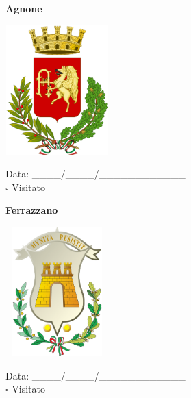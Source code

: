 \documentclass[a5paper,12pt]{article}
\begin{document}
\noindent
\begin{minipage}[t]{0.45\textwidth}
    \begin{center}
        \textbf{Agnone}
    \end{center}
    \vspace{-0.5cm} %
    \begin{center}
        \includegraphics[height= 5cm, width=4cm]{Molise/Agnone-Stemma.png}
    \end{center}
    \vspace{-0.4cm} %
    \begin{flushleft}
        Data: \_\_\_\_/\_\_\_\_/\_\_\_\_\_\_\_\_\_\_\_\_ \\
        $\square$ Visitato
    \end{flushleft}
\end{minipage}
\hfill
\begin{minipage}[t]{0.45\textwidth}
    \begin{center}
        \textbf{Ferrazzano}
    \end{center}
    \vspace{-0.5cm} %
    \begin{center}
        \includegraphics[height= 5cm, width=4cm]{Molise/Ferrazzano-Stemma.png}
    \end{center}
    \vspace{-0.4cm} %
    \begin{flushleft}
        Data: \_\_\_\_/\_\_\_\_/\_\_\_\_\_\_\_\_\_\_\_\_ \\
        $\square$ Visitato
    \end{flushleft}
\end{minipage}
\hfill
\end{document}
